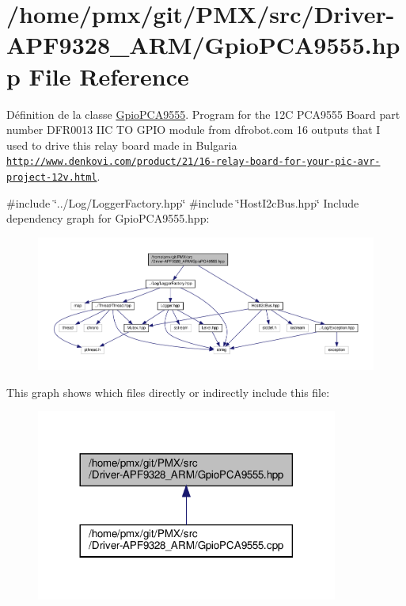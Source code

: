 \hypertarget{Driver-APF9328__ARM_2GpioPCA9555_8hpp}{}\section{/home/pmx/git/\+P\+M\+X/src/\+Driver-\/\+A\+P\+F9328\+\_\+\+A\+R\+M/\+Gpio\+P\+C\+A9555.hpp File Reference}
\label{Driver-APF9328__ARM_2GpioPCA9555_8hpp}


Définition de la classe \hyperlink{classGpioPCA9555}{Gpio\+P\+C\+A9555}. Program for the 12C P\+C\+A9555 Board part number D\+F\+R0013 I\+IC TO G\+P\+IO module from dfrobot.\+com 16 outputs that I used to drive this relay board made in Bulgaria \href{http://www.denkovi.com/product/21/16-relay-board-for-your-pic-avr-project-12v.html}{\tt http\+://www.\+denkovi.\+com/product/21/16-\/relay-\/board-\/for-\/your-\/pic-\/avr-\/project-\/12v.\+html}.  


{\ttfamily \#include \char`\"{}../\+Log/\+Logger\+Factory.\+hpp\char`\"{}}\newline
{\ttfamily \#include \char`\"{}Host\+I2c\+Bus.\+hpp\char`\"{}}\newline
Include dependency graph for Gpio\+P\+C\+A9555.\+hpp\+:
\nopagebreak
\begin{figure}[H]
\begin{center}
\leavevmode
\includegraphics[width=350pt]{Driver-APF9328__ARM_2GpioPCA9555_8hpp__incl}
\end{center}
\end{figure}
This graph shows which files directly or indirectly include this file\+:
\nopagebreak
\begin{figure}[H]
\begin{center}
\leavevmode
\includegraphics[width=281pt]{Driver-APF9328__ARM_2GpioPCA9555_8hpp__dep__incl}
\end{center}
\end{figure}
